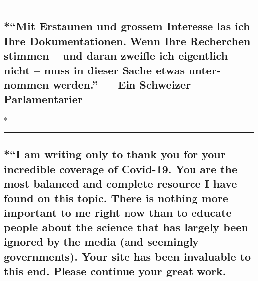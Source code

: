 \begin{center}\rule{0.5\linewidth}{\linethickness}\end{center}

\hypertarget{mit-erstaunen-und-grossem-interesse-las-ich-ihre-dokumentationen-wenn-ihre-recherchen-stimmen--und-daran-zweifle-ich-eigentlich-nicht--muss-in-dieser-sache-etwas-unternommen-werden--ein-schweizer-parlamentarier}{%
\subsection{*``Mit Erstaunen und grossem Interesse las ich Ihre
Doku­men­ta­tionen. Wenn Ihre Recherchen stimmen -- und daran zweifle
ich eigentlich nicht -- muss in dieser Sache etwas unter­nommen
werden.'' --- Ein Schweizer
Parlamentarier}\label{mit-erstaunen-und-grossem-interesse-las-ich-ihre-dokumentationen-wenn-ihre-recherchen-stimmen--und-daran-zweifle-ich-eigentlich-nicht--muss-in-dieser-sache-etwas-unternommen-werden--ein-schweizer-parlamentarier}}

*

\begin{center}\rule{0.5\linewidth}{\linethickness}\end{center}

\hypertarget{i-am-writing-only-to-thank-you-for-your-incredible-coverage-of-covid-19-you-are-the-most-balanced-and-complete-resource-i-have-found-on-this-topic-there-is-nothing-more-important-to-me-right-now-than-to-educate-people-about-the-science-that-has-largely-been-ignored-by-the-media-and-seemingly-governments-your-site-has-been-invaluable-to-this-end-please-continue-your-great-work}{%
\subsection{*``I am writing only to thank you for your incredible
coverage of Covid-19. You are the most balanced and complete resource I
have found on this topic. There is nothing more important to me right
now than to educate people about the science that has largely been
ignored by the media (and seemingly governments). Your site has been
invaluable to this end. Please continue your great
work.}\label{i-am-writing-only-to-thank-you-for-your-incredible-coverage-of-covid-19-you-are-the-most-balanced-and-complete-resource-i-have-found-on-this-topic-there-is-nothing-more-important-to-me-right-now-than-to-educate-people-about-the-science-that-has-largely-been-ignored-by-the-media-and-seemingly-governments-your-site-has-been-invaluable-to-this-end-please-continue-your-great-work}}


